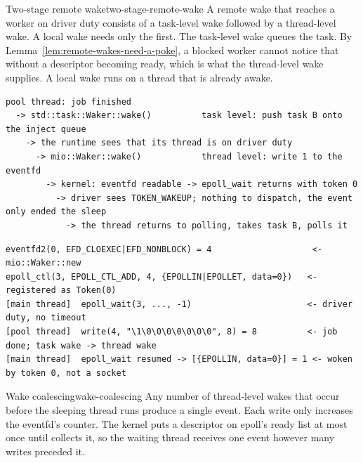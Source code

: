 \begin{lemma}{Two-stage remote wake}{two-stage-remote-wake}
    A remote wake that reaches a worker on driver duty consists of a task-level wake followed by a thread-level wake. A local wake needs only the first.
    \why The task-level wake queues the task. By Lemma~\ref{lem:remote-wakes-need-a-poke}, a blocked worker cannot notice that without a descriptor becoming ready, which is what the thread-level wake supplies. A local wake runs on a thread that is already awake.
\end{lemma}

\begin{lstlisting}[language={}, numbers=none, caption={The two stages of a remote wake.}, label=lst:wakers-13.1]
pool thread: job finished
  -> std::task::Waker::wake()          task level: push task B onto the inject queue
    -> the runtime sees that its thread is on driver duty
      -> mio::Waker::wake()            thread level: write 1 to the eventfd
        -> kernel: eventfd readable -> epoll_wait returns with token 0
          -> driver sees TOKEN_WAKEUP; nothing to dispatch, the event only ended the sleep
            -> the thread returns to polling, takes task B, polls it
\end{lstlisting}

\begin{lstlisting}[language={}, numbers=none, caption={\texttt{strace} of a \texttt{current\_thread} runtime awaiting \texttt{spawn\_blocking(|| \{ sleep(50 ms); 42 \})} (Listing~\ref{lst:wakers-A.2}).}, label=lst:wakers-13.2]
eventfd2(0, EFD_CLOEXEC|EFD_NONBLOCK) = 4                    <- mio::Waker::new
epoll_ctl(3, EPOLL_CTL_ADD, 4, {EPOLLIN|EPOLLET, data=0})   <- registered as Token(0)
[main thread]  epoll_wait(3, ..., -1)                       <- driver duty, no timeout
[pool thread]  write(4, "\1\0\0\0\0\0\0\0", 8) = 8          <- job done; task wake -> thread wake
[main thread]  epoll_wait resumed -> [{EPOLLIN, data=0}] = 1 <- woken by token 0, not a socket
\end{lstlisting}

\begin{lemma}{Wake coalescing}{wake-coalescing}
    Any number of thread-level wakes that occur before the sleeping thread runs produce a single event.
    \why Each write only increases the eventfd's counter. The kernel puts a descriptor on epoll's ready list at most once until  collects it, so the waiting thread receives one event however many writes preceded it.
\end{lemma}

